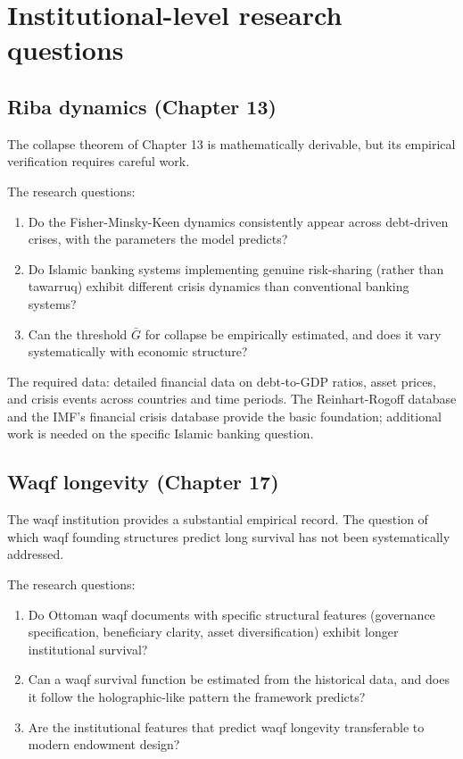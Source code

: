 \section{Institutional-level research questions}
\label{sec:agenda-institutional}

\subsection{Riba dynamics (Chapter 13)}

The collapse theorem of Chapter 13 is mathematically derivable,
but its empirical verification requires careful work.

The research questions:

\begin{enumerate}[leftmargin=2em]
    \item Do the Fisher-Minsky-Keen dynamics consistently appear
    across debt-driven crises, with the parameters the model
    predicts?
    \item Do Islamic banking systems implementing genuine
    risk-sharing (rather than tawarruq) exhibit different crisis
    dynamics than conventional banking systems?
    \item Can the threshold $\bar{G}$ for collapse be empirically
    estimated, and does it vary systematically with economic
    structure?
\end{enumerate}

The required data: detailed financial data on debt-to-GDP ratios,
asset prices, and crisis events across countries and time
periods. The Reinhart-Rogoff database and the IMF's financial
crisis database provide the basic foundation; additional work is
needed on the specific Islamic banking question.

\subsection{Waqf longevity (Chapter 17)}

The waqf institution provides a substantial empirical record. The
question of which waqf founding structures predict long survival
has not been systematically addressed.

The research questions:

\begin{enumerate}[leftmargin=2em]
    \item Do Ottoman waqf documents with specific structural
    features (governance specification, beneficiary clarity,
    asset diversification) exhibit longer institutional survival?
    \item Can a waqf survival function be estimated from the
    historical data, and does it follow the holographic-like
    pattern the framework predicts?
    \item Are the institutional features that predict waqf
    longevity transferable to modern endowment design?
\end{enumerate}

